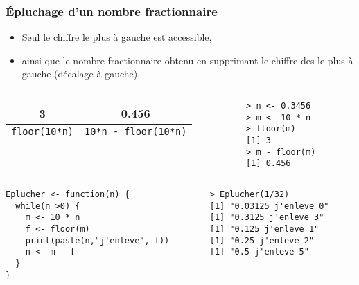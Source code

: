 \documentclass[10pt]{beamer}
\begin{document}
\begin{frame}[fragile]
  \frametitle{Épluchage d'un nombre fractionnaire}
  \begin{itemize}
  \item Seul le chiffre le plus à gauche est accessible, 
  \item ainsi que le nombre fractionnaire obtenu en supprimant le chiffre des le plus à gauche (décalage à gauche).
  \end{itemize}
 
  \begin{columns}[c]
    \begin{column}{0.6\textwidth}
      \begin{center}
  \begin{tabular}{c|c}
    \toprule
    3                    & 0.456                         \\
    \midrule
    \texttt{floor(10*n)} & \texttt{10*n - floor(10*n)} \\
    \bottomrule
  \end{tabular}
\end{center}  
\end{column}
\begin{column}{0.4\textwidth}
  \begin{lstlisting}
> n <- 0.3456
> m <- 10 * n
> floor(m)
[1] 3
> m - floor(m)
[1] 0.456
\end{lstlisting}
\end{column}
\end{columns}



\begin{columns}[t]
\begin{column}{0.6\textwidth}
\begin{lstlisting}[style=editor]
Eplucher <- function(n) {
  while(n >0) {
    m <- 10 * n
    f <- floor(m)
    print(paste(n,"j'enleve", f))
    n <- m - f
  }
}  
\end{lstlisting}
\end{column}
\begin{column}{0.4\textwidth}
\begin{lstlisting}
> Eplucher(1/32)
[1] "0.03125 j'enleve 0"
[1] "0.3125 j'enleve 3"
[1] "0.125 j'enleve 1"
[1] "0.25 j'enleve 2"
[1] "0.5 j'enleve 5"
\end{lstlisting}
\end{column}
\end{columns}

\end{frame}
\end{document}
